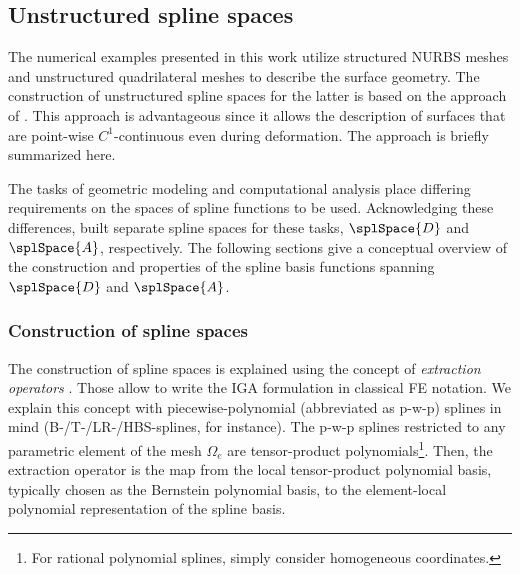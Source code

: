 \documentclass[11pt]{article}
\begin{document}
\subsection{Unstructured spline spaces}\label{sec:spaceDisc_splines}

The numerical examples presented in this work utilize structured NURBS meshes and unstructured quadrilateral meshes to describe the surface geometry. 
The construction of unstructured spline spaces for the latter is based on the approach of \citet{toshniwal2017smooth}. 
This approach is advantageous since it allows the description of surfaces that are point-wise $C^1$-continuous even during deformation.
The approach is briefly summarized here.

The tasks of geometric modeling and computational analysis place differing requirements on the spaces of spline functions to be used. 
Acknowledging these differences, \cite{toshniwal2017smooth} built separate spline spaces for these tasks, $\splSpace{D}$ and $\splSpace{A}$, respectively.
The following sections give a conceptual overview of the construction and properties of the spline basis functions spanning $\splSpace{D}$ and $\splSpace{A}$.

\subsubsection{Construction of spline spaces}

The construction of spline spaces is explained using the concept of \emph{extraction operators} \citep{borden2011isogeometric}. 
Those allow to write the IGA formulation in classical FE notation.
We explain this concept with piecewise-polynomial (abbreviated as p-w-p) splines in mind (B-/T-/LR-/HBS-splines, for instance). 
The p-w-p splines restricted to any parametric element of the mesh $\Omega_e$ are tensor-product polynomials\footnote{For rational polynomial splines, simply consider homogeneous coordinates.}. 
Then, the extraction operator is the map from the local tensor-product polynomial basis, typically chosen as the Bernstein polynomial basis, to the element-local polynomial representation of the spline basis.
\end{document}
